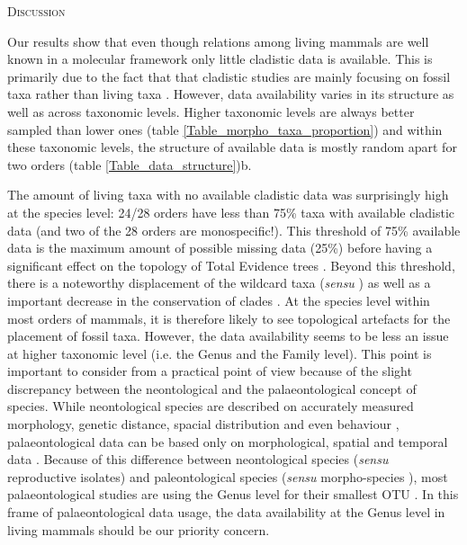 \documentclass[12pt,letterpaper]{article}
\renewcommand{\section}[1]{%
\bigskip
\begin{center}
\begin{Large}
\normalfont\scshape #1
\medskip
\end{Large}
\end{center}}
\renewcommand{\subsection}[1]{%
\bigskip
\begin{center}
\begin{large}
\normalfont\itshape #1
\end{large}
\end{center}}
\begin{document}
%
%

\section{Discussion}
Our results show that even though relations among living mammals are well known in a molecular framework \citep[e.g.][]{FritzTree,meredithimpacts2011,May-Collado-PeerJ} only little cladistic data is available.
This is primarily due to the fact that that cladistic studies are mainly focusing on fossil taxa rather than living taxa \citep[e.g.][]{O'Leary08022013,ni2013oldest}.
However, data availability varies in its structure as well as across taxonomic levels.
Higher taxonomic levels are always better sampled than lower ones (table \ref{Table_morpho_taxa_proportion}) and within these taxonomic levels, the structure of available data is mostly random apart for two orders (table \ref{Table_data_structure})b.

The amount of living taxa with no available cladistic data was surprisingly high at the species level: 24/28 orders have less than 75\% taxa with available cladistic data (and two of the 28 orders are monospecific!).
This threshold of 75\% available data is the maximum amount of possible missing data (25\%) before having a significant effect on the topology of Total Evidence trees \citep{GuillermeCooper}.
Beyond this threshold, there is a noteworthy displacement of the wildcard taxa (\textit{sensu} \citep{kearneyfragmentary2002}) as well as a important decrease in the conservation of clades \citep{GuillermeCooper}.
At the species level within most orders of mammals, it is therefore likely to see topological artefacts for the placement of fossil taxa.
However, the data availability seems to be less an issue at higher taxonomic level (i.e. the Genus and the Family level).
This point is important to consider from a practical point of view because of the slight discrepancy between the neontological and the palaeontological concept of species.
While neontological species are described on accurately measured morphology, genetic distance, spacial distribution and even behaviour \citep[e.g.][]{kellymolecular2014}, palaeontological data can be based only on morphological, spatial and temporal data \citep[e.g.][]{ni2013oldest}.
Because of this difference between neontological species (\textit{sensu} reproductive isolates) and paleontological species (\textit{sensu} morpho-species %
), most palaeontological studies are using the Genus level for their smallest OTU \citep[e.g.][]{ni2013oldest,O'Leary08022013}.
In this frame of palaeontological data usage, the data availability at the Genus level in living mammals should be our priority concern.
\end{document}
